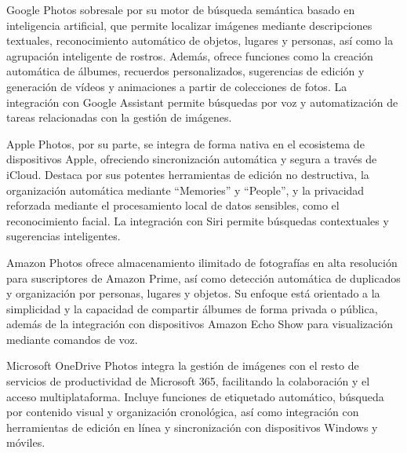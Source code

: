 Google Photos sobresale por su motor de búsqueda semántica basado en inteligencia artificial, que permite localizar imágenes mediante descripciones textuales, reconocimiento automático de objetos, lugares y personas, así como la agrupación inteligente de rostros. Además, ofrece funciones como la creación automática de álbumes, recuerdos personalizados, sugerencias de edición y generación de vídeos y animaciones a partir de colecciones de fotos. La integración con Google Assistant permite búsquedas por voz y automatización de tareas relacionadas con la gestión de imágenes.

Apple Photos, por su parte, se integra de forma nativa en el ecosistema de dispositivos Apple, ofreciendo sincronización automática y segura a través de iCloud. Destaca por sus potentes herramientas de edición no destructiva, la organización automática mediante “Memories” y “People”, y la privacidad reforzada mediante el procesamiento local de datos sensibles, como el reconocimiento facial. La integración con Siri permite búsquedas contextuales y sugerencias inteligentes.

Amazon Photos ofrece almacenamiento ilimitado de fotografías en alta resolución para suscriptores de Amazon Prime, así como detección automática de duplicados y organización por personas, lugares y objetos. Su enfoque está orientado a la simplicidad y la capacidad de compartir álbumes de forma privada o pública, además de la integración con dispositivos Amazon Echo Show para visualización mediante comandos de voz.

Microsoft OneDrive Photos integra la gestión de imágenes con el resto de servicios de productividad de Microsoft 365, facilitando la colaboración y el acceso multiplataforma. Incluye funciones de etiquetado automático, búsqueda por contenido visual y organización cronológica, así como integración con herramientas de edición en línea y sincronización con dispositivos Windows y móviles.

